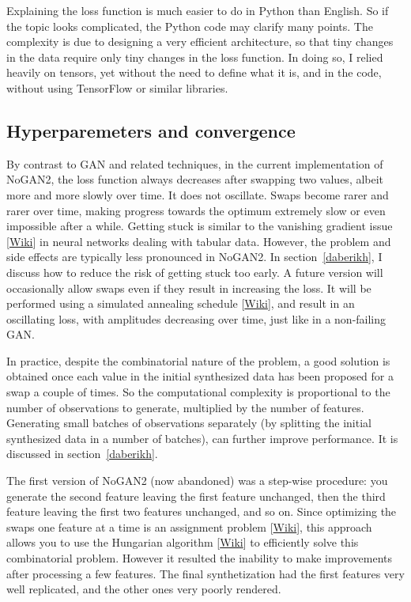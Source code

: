 \documentclass[oneside,10pt]{book}
\begin{document}
Explaining the loss function is much easier to do in Python than English. So if the topic looks complicated, the Python code may clarify many points.
 The complexity is due to designing a very efficient architecture, so that tiny changes in the data require only tiny changes in the loss function.
 In doing so, I relied heavily on \textcolor{index}{tensors}, yet without the need to define what it is, and in the code,
 without using \textcolor{index}{TensorFlow} or similar libraries.



\subsection{Hyperparemeters  and convergence}\label{oipvbc}

By contrast to GAN and related techniques, in the current implementation of NoGAN2, the loss function always decreases after swapping two values, albeit more and more slowly over time. It does not oscillate. Swaps become rarer and rarer over time, making progress towards the optimum extremely slow or even impossible after a while. Getting stuck is similar to the \textcolor{index}{vanishing gradient} issue 
 [\href{https://en.wikipedia.org/wiki/Vanishing_gradient_problem}{Wiki}] in neural networks dealing with tabular data. However,
 the problem and side effects are typically less pronounced in NoGAN2. In section~\ref{daberikh}, I discuss how to reduce the risk of getting stuck too early. A future version will occasionally allow swaps even if they result in increasing the loss. It will be performed 
 using a \textcolor{index}{simulated annealing} schedule [\href{https://en.wikipedia.org/wiki/Simulated_annealing}{Wiki}], and result in an oscillating loss, with amplitudes decreasing over time, just like in a non-failing GAN. 

In practice, despite the combinatorial nature of the problem, a good solution is obtained once each value in the initial synthesized data has been proposed for a swap a couple of times. So the computational complexity is proportional to the number of observations to generate, multiplied by the
 number of features.  Generating small \textcolor{index}{batches} of observations separately (by splitting the initial synthesized data in a number of batches), can further improve performance. It is discussed
 in section~\ref{daberikh}.

The first version of NoGAN2 (now abandoned) was a step-wise procedure: you generate the second feature leaving the first feature unchanged, then the third feature leaving the first two features unchanged, and so on. Since optimizing the swaps one feature at a time is an 
 \textcolor{index}{assignment problem} [\href{https://en.wikipedia.org/wiki/Assignment_problem}{Wiki}], this approach allows you to use the \textcolor{index}{Hungarian algorithm} [\href{https://en.wikipedia.org/wiki/Hungarian_algorithm}{Wiki}]
to efficiently solve this combinatorial problem. However it resulted the inability to make improvements  after processing a few features. The final  synthetization had the first features very well replicated, and the other ones very poorly rendered.
\end{document}
